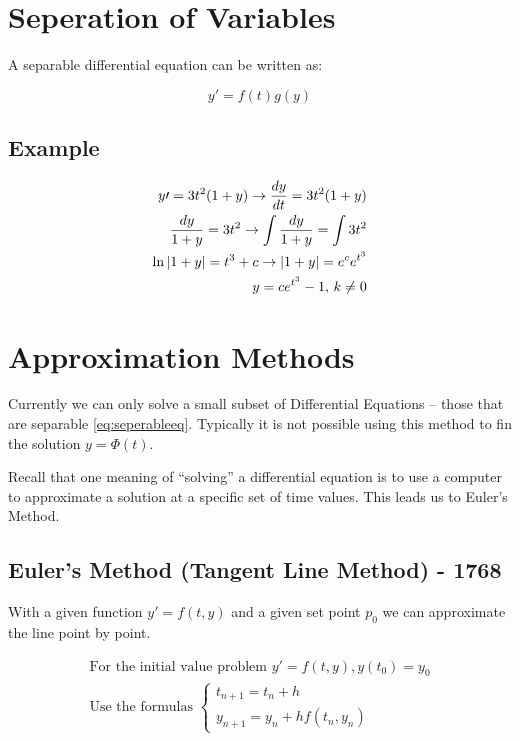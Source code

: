 \section{Seperation of Variables}
A separable differential equation can be written as:

\begin{equation}\label{eq:seperableeq}
y\prime = f(t)g(y)
\end{equation}

    \subsection{Example}
    \[
    \begin{aligned}
        y\prime = 3t^2 (1 + y) \to \frac{dy}{dt} = 3t^2 (1 + y)\\
        \frac{dy}{1+y} = 3t^2 \to \int \frac{dy}{1+y} = \int 3t^2\\
        \ln\left\lvert 1 + y \right\rvert = t^3 + c \to \left\lvert 1 + y \right\rvert = e^c e^{t^3}\\
        y = c e^{t^3} - 1, \, k \ne 0
    \end{aligned}
    \]

\section{Approximation Methods}

Currently we can only solve a small subset of Differential Equations -- those that are separable \eqref{eq:seperableeq}. Typically it is not possible using this method to fin the solution $y=\Phi (t)$.

Recall that one meaning of ``solving'' a differential equation is to use a computer to approximate a solution at a specific set of time values. This leads us to Euler's Method.

    \subsection{Euler's Method (Tangent Line Method) - 1768}
    With a given function $y\prime = f(t,y)$ and a given set point $p_0$ we can approximate the line point by point.

    \begin{equation}\label{eq:eulersmethod}
    \begin{aligned}
    \text{For the initial value problem } y\prime = f(t,y), y(t_0) = y_0\\
    \text{Use the formulas }
    \begin{cases}
    t_{n+1} = t_n + h\\
    y_{n+1} = y_n + h f(t_n, y_n)
    \end{cases}
    \end{aligned}
    \end{equation}

